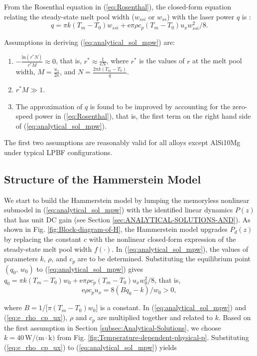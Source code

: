 \documentclass [11pt, proquest] {uwthesis}[2020/02/24]
\begin{document}
From the Rosenthal equation in (\ref{eq:Rosenthal}), the closed-form
equation relating the steady-state melt pool width ($w_{ssi}$ or
$w_{ss}$) with the laser power $q$ is \cite{tang2017prediction}:
\noindent 
\begin{equation}
q=\pi k(T_{m}-T_{0})w_{ssi}+\text{e}\pi\rho c_{p}(T_{m}-T_{0})u_{x}w_{ssi}^{2}/8.\label{eq:analytical_sol_mpw}
\end{equation}

Assumptions in deriving (\ref{eq:analytical_sol_mpw}) are:
\begin{enumerate}
\item $-\frac{\text{ln}(r^{*}N)}{r^{*}M}\approx0$, that is, $r^{*}\approx\frac{1}{\text{e}N}$,
where $r^{*}$ is the values of $r$ at the melt pool width, $M=\frac{u_{x}}{2\kappa}$,
and $N=\frac{2\pi k(T_{m}-T_{0})}{q}$. 
\item $r^{*}M\gg1$.
\item The approximation of $q$ is found to be improved by accounting for
the zero-speed power in (\ref{eq:Rosenthal}), that is, the first
term on the right hand side of (\ref{eq:analytical_sol_mpw}). 
\end{enumerate}
The first two assumptions are reasonably valid for all alloys except
AlSi10Mg under typical LPBF configurations.

\subsection{Structure of the Hammerstein Model}

We start to build the Hammerstein model by lumping the memoryless
nonlinear submodel in (\ref{eq:analytical_sol_mpw}) with the identified
linear dynamics $P(z)$ that has unit DC gain (see Section \ref{sec:ANALYTICAL-SOLUTIONS-AND}).
As shown in Fig. \ref{fig:Block-diagram-of-H}, the Hammerstein model
upgrades $P_{d}(z)$ by replacing the constant $c$ with the nonlinear
closed-form expression of the steady-state melt pool width $f(\cdot)$.
In (\ref{eq:analytical_sol_mpw}), the values of parameters $k$,
$\rho$, and $c_{p}$ are to be determined. Substituting the equilibrium point $(q_{0},\,w_{0})$ to (\ref{eq:analytical_sol_mpw})
gives $q_{0}=\pi k(T_{m}-T_{0})w_{0}+\text{e}\pi\rho c_{p}(T_{m}-T_{0})u_{x}w_{0}^{2}/8$,
that is,
\noindent 
\begin{equation}
\text{e}\rho c_{p}u_{x}=8(Bq_{0}-k)/w_{0}>0,\label{eq:e_rho_cp_ux}
\end{equation}

\noindent where $B=1/\text{[}\pi(T_{m}-T_{0})w_{0}]$ is a constant.
In (\ref{eq:analytical_sol_mpw}) and (\ref{eq:e_rho_cp_ux}), $\rho$
and $c_{p}$ are multiplied together and related to $k$. Based on
the first assumption in Section \ref{subsec:Analytical-Solutions},
we choose $k=40\,\text{W/(m}\cdot\text{k)}$ from Fig. \ref{fig:Temperature-dependent-physical-p}.
Substituting (\ref{eq:e_rho_cp_ux}) to (\ref{eq:analytical_sol_mpw})
yields
\end{document}
